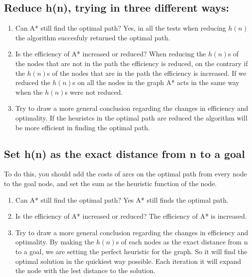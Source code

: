 \documentclass{article}
\def\ans#1{{\color{ans}#1}}
\begin{document}
\subsection{Reduce h(n), trying in three different ways:}
\begin{enumerate}[label=(\alph*)]
    \item Can A* still find the optimal path? 
    \ans{
        Yes, in all the tests when reducing $h(n)$ the algorithm succesfuly returned the optimal path.
    }
    \item Is the efficiency of A* increased or reduced? 
    \ans{
        When reducing the $h(n)$s of the nodes that are not in the path the efficiency is reduced, on 
        the contrary if the $h(n)$s of the nodes that are in the path the efficiency is increased. If 
        we reduced the $h(n)$s on all the nodes in the graph A* acts in the same way when the $h(n)$s 
        were not reduced.
    }
    \item Try to draw a more general conclusion regarding the changes in efficiency and optimality. 
    \ans{
        If the heuristcs in the optimal path are reduced the algorithm will be more efficient in finding 
        the optimal path.
    }
\end{enumerate}

\subsection{Set h(n) as the exact distance from n to a goal}
To do this, you should add the costs of arcs on the optimal path from every node to the goal node, and set the sum as the heuristic function of the node. 
\begin{enumerate}[label=(\alph*)]
    \item Can A* still find the optimal path? 
    \ans{
        Yes A* still finds the optimal path.
    }
    \item Is the efficiency of A* increased or reduced? 
    \ans{
        The efficiency of A* is increased.
    }
    \item Try to draw a more general conclusion regarding the changes in efficiency and optimality. 
    \ans{
        By making the $h(n)$s of each nodes as the exact distance from n to a goal, we are setting the 
        perfect heuristic for the graph. So it will find the optimal solution in the quickiest way possible.
        Each iteration it will expand the node with the lest distance to the solution.
    }
\end{enumerate}
\end{document}
